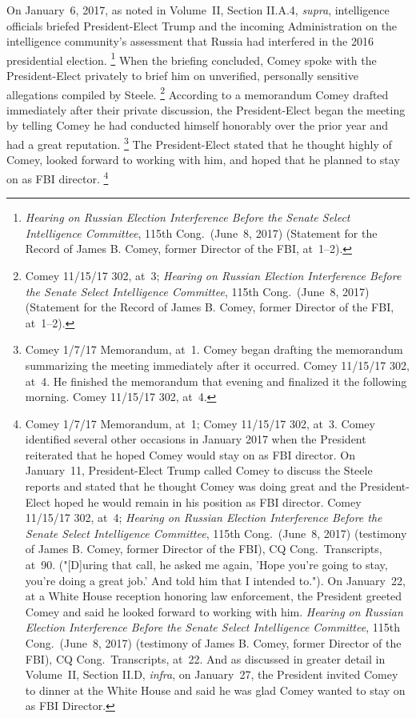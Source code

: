 On January~6, 2017, as noted in Volume~II, Section II.A.4, \textit{supra}, intelligence officials briefed President-Elect Trump and the incoming Administration on the intelligence community's assessment that Russia had interfered in the 2016 presidential election.%
\footnote{\textit{Hearing on Russian Election Interference Before the Senate Select Intelligence Committee}, 115th Cong.\ (June~8, 2017) (Statement for the Record of James B. Comey, former Director of the FBI, at~1--2).}
When the briefing concluded, Comey spoke with the President-Elect privately to brief him on unverified, personally sensitive allegations compiled by Steele.%
\footnote{Comey 11/15/17 302, at~3;
\textit{Hearing on Russian Election Interference Before the Senate Select Intelligence Committee}, 115th Cong.\ (June~8, 2017) (Statement for the Record of James B. Comey, former Director of the FBI, at~1--2).}
According to a memorandum Comey drafted immediately after their private discussion, the President-Elect began the meeting by telling Comey he had conducted himself honorably over the prior year and had a great reputation.%
\footnote{Comey 1/7/17 Memorandum, at~1.
Comey began drafting the memorandum summarizing the meeting immediately after it occurred.
Comey 11/15/17 302, at~4.
He finished the memorandum that evening and finalized it the following morning.
Comey 11/15/17 302, at~4.}
The President-Elect stated that he thought highly of Comey, looked forward to working with him, and hoped that he planned to stay on as FBI director.%
\footnote{Comey 1/7/17 Memorandum, at~1;
Comey 11/15/17 302, at~3.
Comey identified several other occasions in January 2017 when the President reiterated that he hoped Comey would stay on as FBI director.
On January~11, President-Elect Trump called Comey to discuss the Steele reports and stated that he thought Comey was doing great and the President-Elect hoped he would remain in his position as FBI director.
Comey 11/15/17 302, at~4;
\textit{Hearing on Russian Election Interference Before the Senate Select Intelligence Committee}, 115th Cong.\ (June~8, 2017) (testimony of James B. Comey, former Director of the FBI), CQ Cong.\ Transcripts, at~90.
("[D]uring that call, he asked me again, 'Hope you're going to stay, you're doing a great job.' And told him that I intended to.").
On January~22, at a White House reception honoring law enforcement, the President greeted Comey and said he looked forward to working with him.
\textit{Hearing on Russian Election Interference Before the Senate Select Intelligence Committee}, 115th Cong.\ (June~8, 2017) (testimony of James B. Comey, former Director of the FBI), CQ Cong.\ Transcripts, at~22.
And as discussed in greater detail in Volume~II, Section II.D, \textit{infra}, on January~27, the President invited Comey to dinner at the White House and said he was glad Comey wanted to stay on as FBI Director.}
